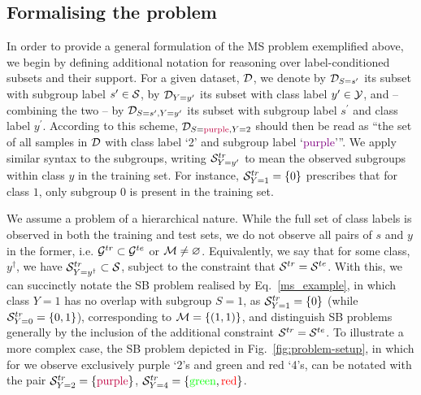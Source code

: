 \subsection{Formalising the problem}\label{ssec:problem_formalism}
In order to provide a general formulation of the MS problem exemplified above, we begin by defining
additional notation for reasoning over label-conditioned subsets and their support. 
%
For a given dataset, \( {\mathcal{D}} \), we denote by \( {\mathcal{D}}_{S=s^\prime} \) its subset with subgroup label
\( s^\prime \in {\mathcal{S}} \), by \( {\mathcal{D}}_{Y=y^\prime} \) its subset with class label \( y^\prime \in {\mathcal{Y}}
\), and -- combining the two -- by \( {\mathcal{D}}_{S=s^\prime,Y=y^\prime} \) its subset with subgroup label
\( s^\prime \) and class label \( y^\prime \).
%
According to this scheme, \( {\mathcal{D}}_{S=\text{\color{purple}{purple}}, Y=\text{2}} \) should then be
read as ``the set of all samples in \( {\mathcal{D}} \) with class label `2' and subgroup label
`\textcolor{purple}{purple}'''.
%
We apply similar syntax to the subgroups, writing \( {\mathcal{S}}^{tr}_{Y=y^\prime} \) to mean the observed
subgroups within class \(y\) in the training set.
%
For instance, \({\mathcal{S}}^{tr}_{Y=1}=\{0\}\) prescribes that for class \(1\), only subgroup \(0\) is
present in the training set.

We assume a problem of a hierarchical nature.
%
While the full set of class labels is observed in both the training and test sets, we do not
observe all pairs of \(s\) and \(y\) in the former, i.e. \( {\mathcal{G}}^{tr} \subset {\mathcal{G}}^{te} \) or \({\mathcal{M}}
\neq \varnothing \). 
%
Equivalently, we say that for some class, \(y^\dagger\), we have \( {\mathcal{S}}^{tr}_{Y=y^\dagger} \subset
{\mathcal{S}} \), subject to the constraint that \(  {\mathcal{S}}^{tr} = {\mathcal{S}}^{te} \).
%
With this, we can succinctly notate the SB problem realised by Eq.~\ref{ms_example}, in which class
\(Y=1\) has no overlap with subgroup \(S=1\), as \({\mathcal{S}}^{tr}_{Y=1}=\{0\}\) (while
\({\mathcal{S}}^{tr}_{Y=0}=\{ 0, 1 \}\)), corresponding to \( {\mathcal{M}} = \{(1, 1)\} \), and distinguish SB
problems generally by the inclusion of the additional constraint \( {\mathcal{S}}^{tr} = {\mathcal{S}}^{te} \).
%
To illustrate a more complex case, the SB problem depicted in Fig.~\ref{fig:problem-setup}, in
which for we observe exclusively purple `2's and green and red `4's, can be notated with the pair
\( {\mathcal{S}}^{tr}_{Y=2}=\{\text{\textcolor{purple}{purple}\}} \), \( {\mathcal{S}}^{tr}_{Y=4}=\{
\text{\textcolor{green}{green}}, \text{\textcolor{red}{red}} \} \).
